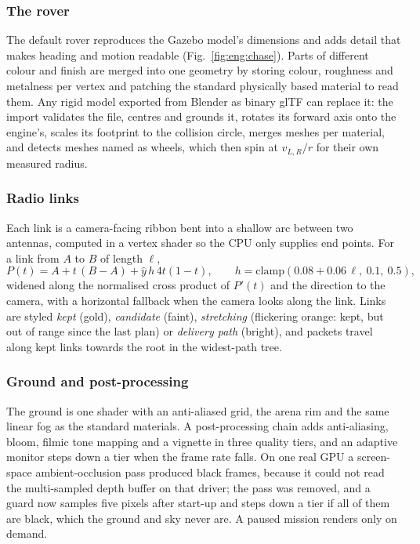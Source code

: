 \subsubsection{The rover} The default rover reproduces the Gazebo model's
dimensions and adds detail that makes heading and motion readable
(Fig.~\ref{fig:eng:chase}). Parts of different colour and finish are merged
into one geometry by storing colour, roughness and metalness per vertex and
patching the standard physically based material to read them. Any rigid model
exported from Blender as binary glTF can replace it: the import validates the
file, centres and grounds it, rotates its forward axis onto the engine's,
scales its footprint to the collision circle, merges meshes per material, and
detects meshes named as wheels, which then spin at $v_{L,R}/r$ for their own
measured radius.

\subsubsection{Radio links} Each link is a camera-facing ribbon bent into a
shallow arc between two antennas, computed in a vertex shader so the CPU only
supplies end points. For a link from $A$ to $B$ of length $\ell$,
\begin{equation}
P(t)=A+t\,(B-A)+\hat y\,h\,4t(1-t),\qquad h=\mathrm{clamp}(0.08+0.06\,\ell,\ 0.1,\ 0.5),
\end{equation}
widened along the normalised cross product of $P'(t)$ and the direction to
the camera, with a horizontal fallback when the camera looks along the link.
Links are styled \emph{kept} (gold), \emph{candidate} (faint),
\emph{stretching} (flickering orange: kept, but out of range since the last
plan) or \emph{delivery path} (bright), and packets travel along kept links
towards the root in the widest-path tree.

\subsubsection{Ground and post-processing} The ground is one shader with an
anti-aliased grid, the arena rim and the same linear fog as the standard
materials. A post-processing chain adds anti-aliasing, bloom, filmic tone
mapping and a vignette in three quality tiers, and an adaptive monitor steps
down a tier when the frame rate falls. On one real GPU a screen-space
ambient-occlusion pass produced black frames, because it could not read the
multi-sampled depth buffer on that driver; the pass was removed, and a guard
now samples five pixels after start-up and steps down a tier if all of them
are black, which the ground and sky never are. A paused mission renders only
on demand.

